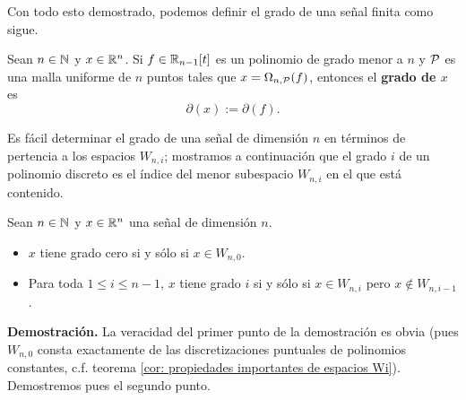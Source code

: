Con todo esto demostrado, podemos definir
el grado de una señal finita como sigue.


\begin{defi}
\label{def: del grado de una senial finita}
Sean $n \in \mathbb{N}$ y $x \in \mathbb{R}^{n}$.
Si $f \in \mathbb{R}_{n-1}[t]$
es un polinomio de grado menor a $n$
y $\mathcal{P}$ es una malla uniforme
de $n$ puntos tales que
$x= \Omega_{n, \mathcal{P}}(f)$, entonces
el \textbf{grado de $x$} es 
\[
\partial(x):= \partial(f).
\]
\end{defi}

Es fácil determinar el grado de una señal 
de dimensión $n$
en términos de pertencia a los espacios $W_{n,i}$;
mostramos a continuación que
el grado $i$ de un polinomio discreto es el índice
del menor subespacio $W_{n,i}$ en el que está contenido.

\begin{prop}
\label{prop: grado de x}
Sean $n \in \mathbb{N}$ y $x \in \mathbb{R}^{n}$ una señal de dimensión $n$.
\begin{itemize}
\item $x$ tiene grado cero si y sólo si $x \in W_{n,0}$.
\item Para toda $1 \leq i \leq n-1$,
$x$ tiene
grado $i$ si y sólo si 
$x \in W_{n,i}$ pero $x \not\in W_{n,i-1}$.
\end{itemize}
\end{prop}
\noindent
\textbf{Demostración.}
La veracidad del primer punto de la demostración
es obvia (pues $W_{n,0}$ consta exactamente de las discretizaciones
puntuales de polinomios constantes, c.f. 
teorema \ref{cor: propiedades importantes de espacios Wi}).
Demostremos pues el segundo punto.

